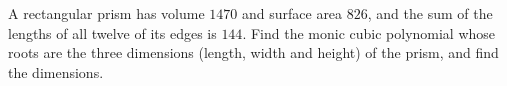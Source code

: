 A rectangular prism has volume $1470$ and surface area $826$, and the sum of the lengths of all twelve of its edges is $144$. Find the monic cubic polynomial whose roots are the three dimensions (length, width and height) of the prism, and find the dimensions.
